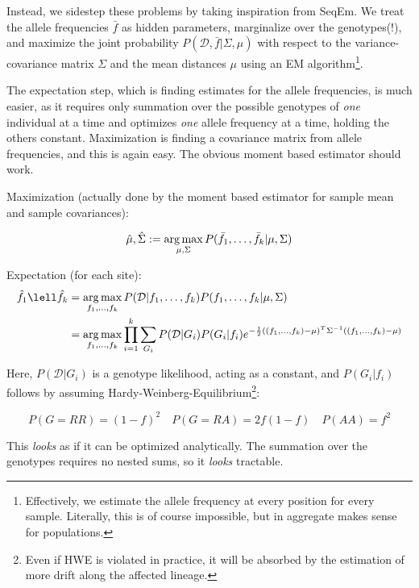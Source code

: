 \documentclass{article}
\newcommand{\argmax}{\operatornamewithlimits{arg\,max}}
\begin{document}
Instead, we sidestep these problems by taking inspiration from
SeqEm\cite{seqem}.  We treat the allele frequencies $\bar{f}$ as
hidden parameters, marginalize over the genotypes(!), and maximize the
joint probability $P(\mathcal{D}, \bar{f} | \Sigma, \mu)$ with
respect to the variance-covariance matrix $\Sigma$ and the mean
distances $\mu$ using an EM algorithm\footnote{Effectively, we estimate
the allele frequency at every position for every sample.  Literally,
this is of course impossible, but in aggregate makes sense for
populations.}.

The expectation step, which is finding estimates for the allele
frequencies, is much easier, as it requires only summation over the
possible genotypes of \emph{one} individual at a time and optimizes
\emph{one} allele frequency at a time, holding the others
constant.  Maximization is finding a covariance
matrix from allele frequencies, and this is again easy.  The obvious
moment based estimator should work.

Maximization (actually done by the moment based estimator for sample
mean and sample covariances):

\begin{equation*}
\hat{\mu}, \hat{\Sigma} := \argmax_{\mu,\Sigma} 
    P(\bar{f}_1,\ldots,\bar{f}_k| \mu,\Sigma)
\end{equation*}

Expectation (for each site):
\begin{align*}
\hat{f_1} \lell \hat{f_k} &= \argmax_{f_1,\ldots,f_k}
    P(\mathcal{D} | f_1,\ldots,f_k) P(f_1,\ldots,f_k | \mu, \Sigma)  \\
    &=  \argmax_{f_1,\ldots,f_k}
    \prod_{i=1}^k \sum_{G_i} P(\mathcal{D} | G_i) P( G_i | f_i ) 
    e^{ -\frac{1}{2} ((f_1,\ldots,f_k) - \mu)^T \Sigma^{-1} ((f_1,\ldots,f_k) - \mu) }
\end{align*}

Here, $P(\mathcal{D}|G_i)$ is a genotype likelihood, acting as a
constant, and $P( G_i | f_i)$ follows by assuming
Hardy-Weinberg-Equilibrium\footnote{Even if HWE is violated in practice,
it will be absorbed by the estimation of more drift along the affected
lineage.}:

\begin{equation*}
P(G=RR) = (1-f)^2 \quad P(G=RA) = 2f(1-f) \quad P(AA) = f^2
\end{equation*}

This \emph{looks} as if it can be optimized analytically.  The summation
over the genotypes requires no nested sums, so it \emph{looks} tractable.
\end{document}
